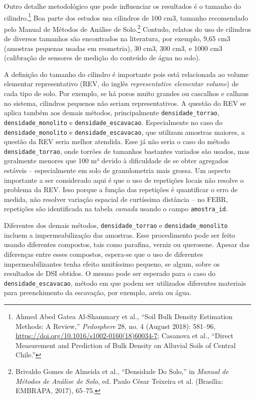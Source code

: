 \documentclass[a4paper,dvipsnames]{tufte-book}
\begin{document}
Outro detalhe metodológico que pode influenciar os resultados é o
tamanho do cilindro.\footnote{Ahmed Abed Gatea Al-Shammary et al.,
  ``Soil Bulk Density Estimation Methods: A Review,'' \emph{Pedosphere}
  28, no. 4 (August 2018): 581--96,
  \url{https://doi.org/10.1016/s1002-0160(18)60034-7}; Casanova et al.,
  ``Direct Measurement and Prediction of Bulk Density on Alluvial Soils
  of Central Chile.''} Boa parte dos estudos usa cilindros de 100 cm3,
tamanho recomendado pelo Manual de Métodos de Análise de Solo.\footnote{Brivaldo
  Gomes de Almeida et al., ``Densidade Do Solo,'' in \emph{Manual de
  Métodos de Análise de Solo}, ed. Paulo César Teixeira et al.
  (Brasília: EMBRAPA, 2017), 65--75.} Contudo, relatos do uso de
cilindros de diversos tamanhos são encontrados na literatura, por
exemplo, 9,65 cm3 (amostras pequenas usadas em reometria), 30 cm3, 300
cm3, e 1000 cm3 (calibração de sensores de medição do conteúdo de água
no solo).

A definição do tamanho do cilindro é importante pois está relacionada ao
volume elementar representativo (REV, do inglês \emph{representative
elementar volume}) de cada tipo de solo. Por exemplo, se há poros muito
grandes ou cascalhos e calhaus no sistema, cilindros pequenos não seriam
representativos. A questão do REV se aplica também aos demais métodos,
principalmente \texttt{densidade\_torrao}, \texttt{densidade\_monolito}
e \texttt{densidade\_escavacao}. Especialmente no caso do
\texttt{densidade\_monolito} e \texttt{densidade\_escavacao}, que
utilizam amostras maiores, a questão da REV seria melhor atendida. Esse
já não seria o caso do método \texttt{densidade\_torrao}, onde torrões
de tamanhos bastantes variados são usados, mas geralmente menores que
100 m³ devido à dificuldade de se obter agregados estáveis --
especialmente em solo de granulometria mais grossa. Um aspecto
importante a ser considerado aqui é que o uso de repetições locais não
resolve o problema da REV. Isso porque a função das repetições é
quantificar o erro de medida, não resolver variação espacial de
curtíssima distância -- no FEBR, repetições são identificada na tabela
\emph{camada} usando o campo \texttt{amostra\_id}.

Diferentes dos demais métodos, \texttt{densidade\_torrao} e
\texttt{densidade\_monolito} incluem a impermeabilização das amostras.
Esse procedimento pode ser feito usando diferentes compostos, tais como
parafina, verniz ou querosene. Apesar das diferenças entre esses
compostos, espera-se que o uso de diferentes impermeabilizantes tenha
efeito muitíssimo pequeno, se algum, sobre os resultados de DSI obtidos.
O mesmo pode ser esperado para o caso do \texttt{densidade\_escavacao},
método em que podem ser utilizados diferentes materiais para
preenchimento da escavação, por exemplo, areia ou água.
\end{document}
